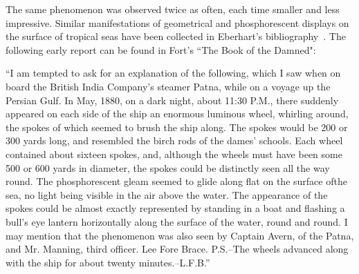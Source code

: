 The same phenomenon was observed twice as often, each time smaller and less impressive.
Similar manifestations of geometrical and phosphorescent displays on the surface of tropical seas have been
collected in Eberhart's bibliography~\cite[Chapter~27]{Eberhart-I-1986Jan}. The following early report can be found
in Fort's ``The Book of the Damned"\cite[Chapter~21]{FortBotD}:
\begin{svgraybox}
``I am tempted to ask for an explanation of the following, which I saw when on board the British India Company's steamer
Patna, while on a voyage up the Persian Gulf. In May, 1880, on a dark night, about 11:30 P.M.,
there suddenly appeared on each side of the ship an enormous luminous wheel, whirling around,
the spokes of which seemed to brush the ship along.
The spokes would be 200 or 300 yards long, and resembled the birch rods of the dames' schools.
Each wheel contained about sixteen spokes, and, although the wheels must have been some 500 or 600 yards in diameter,
the spokes could be distinctly seen all the way round.
The phosphorescent gleam seemed to glide along flat on the surface ofthe sea, no light being visible in the air above the water.
The appearance of the spokes could be almost exactly represented by standing in a boat and flashing a bull's eye lantern
horizontally along the surface of the water, round and round. I may mention that the phenomenon was also seen by Captain Avern, of the
Patna, and Mr. Manning, third officer. Lee Fore Brace. P.S.--The wheels advanced along with the ship for about twenty minutes.--L.F.B.''
\end{svgraybox}

